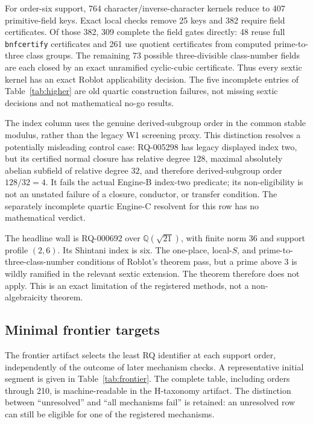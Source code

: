 \documentclass[11pt]{article}
\newcommand{\Q}{\mathbb Q}
\begin{document}
For order-six support, 764 character/inverse-character kernels reduce
to 407 primitive-field keys.  Exact local checks remove 25 keys and
382 require field certificates.  Of those 382, 309 complete the field
gates directly: 48 reuse full \texttt{bnfcertify} certificates and 261
use quotient certificates from computed prime-to-three class groups.
The remaining 73 possible three-divisible class-number fields are each
closed by an exact unramified cyclic-cubic certificate.  Thus every
sextic kernel has an exact Roblot applicability decision.  The five incomplete entries of
Table~\ref{tab:higher} are old quartic construction failures, not
missing sextic decisions and not mathematical no-go results.

The index column uses the genuine derived-subgroup order in the
common stable modulus, rather than the legacy W1 screening proxy.
This distinction resolves a potentially misleading control case:
RQ-005298 has legacy displayed index two, but its certified normal
closure has relative degree $128$, maximal absolutely abelian subfield
of relative degree $32$, and therefore derived-subgroup order
$128/32=4$.  It fails the actual Engine-B index-two predicate; its
non-eligibility is not an unstated failure of a closure, conductor, or
transfer condition.  The separately incomplete quartic Engine-C
resolvent for this row has no mathematical verdict.

The headline wall is RQ-000692 over $\Q(\sqrt{21})$, with finite norm
36 and support profile $(2,6)$.  Its Shintani index is six.  The
one-place, local-$S$, and prime-to-three-class-number conditions of
Roblot's theorem pass, but a prime above 3 is wildly ramified in the
relevant sextic extension.  The theorem therefore does not apply.  This
is an exact limitation of the registered methods, not a non-algebraicity
theorem.

\subsection{Minimal frontier targets}

The frontier artifact selects the least RQ identifier at each support
order, independently of the outcome of later mechanism checks.  A
representative initial segment is given in Table~\ref{tab:frontier}.
The complete table, including orders through 210, is machine-readable
in the H-taxonomy artifact.  The distinction between ``unresolved'' and
``all mechanisms fail'' is retained: an unresolved row can still be
eligible for one of the registered mechanisms.
\end{document}
